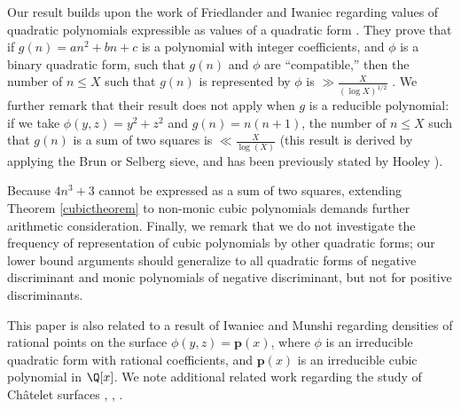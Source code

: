 \documentclass[12pt]{amsart}
\newcommand{\1}{\mathmybb{1}}
\begin{document}
Our result builds upon the work of Friedlander and Iwaniec regarding values of quadratic polynomials expressible as values of a quadratic form \cite{Friedlander}. They prove that if $g(n) = an^2+bn+c$ is a polynomial with integer coefficients, and $\phi$ is a binary quadratic form, such that $g(n)$ and $\phi$ are ``compatible,'' then the number of $n \leq X$ such that $g(n)$ is represented by $\phi$ is $\gg \frac{X}{(\log X)^{1/2}}$ \cite[Theorem 2]{Friedlander}. We further remark that their result does not apply when $g$ is a reducible polynomial: if we take $\phi(y,z) = y^2+z^2$ and $g(n) = n(n+1)$, the number of $n \leq X$ such that $g(n)$ is a sum of two squares is $\ll \frac{X}{\log(X)}$ (this result is derived by applying the Brun or Selberg sieve, and has been previously stated by Hooley \cite[p. 208]{Hooley}).

Because $4n^3+3$ cannot be expressed as a sum of two squares, extending Theorem \ref{cubictheorem} to non-monic cubic polynomials demands further arithmetic consideration. Finally, we remark that we do not investigate the frequency of representation of cubic polynomials by other quadratic forms; our lower bound arguments should generalize to all quadratic forms of negative discriminant and monic polynomials of negative discriminant, but not for positive discriminants.

This paper is also related to a result of Iwaniec and Munshi \cite{Munshi} regarding densities of rational points on the surface $\phi(y,z) = \mathbf{p}(x)$, where $\phi$ is an irreducible quadratic form with rational coefficients, and $\mathbf{p}(x)$ is an irreducible cubic polynomial in $\Q[x]$. We note additional related work regarding the study of Ch\^{a}telet surfaces \cite{Breteche}, \cite{Irving}, \cite{Woopaper}.
\end{document}
